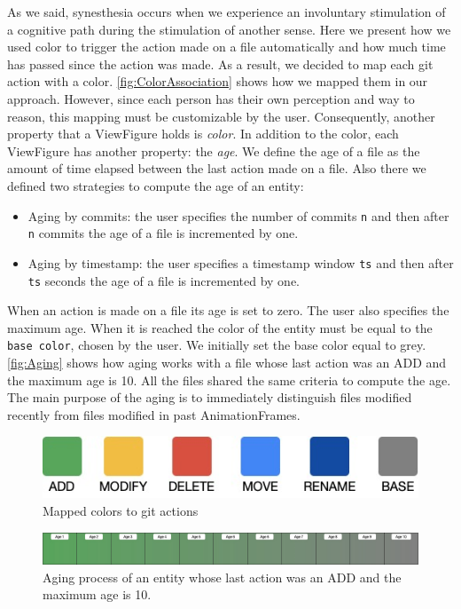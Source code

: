 As we said, synesthesia occurs when we experience an involuntary stimulation of a cognitive path during the stimulation of another sense. Here we present how we used color to trigger the action made on a file automatically and how much time has passed since the action was made. 
As a result, we decided to map each git action with a color. \autoref{fig:ColorAssociation} shows how we mapped them in our approach. However, since each person has their own perception and way to reason, this mapping must be customizable by the user. Consequently, another property that a ViewFigure holds is \textit{color}.
\bigbreak
In addition to the color, each ViewFigure has another property: the \textit{age}. We define the age of a file as the amount of time elapsed between the last action made on a file. Also there we defined two strategies to compute the age of an entity:

\begin{itemize}
    \item{Aging by commits}: the user specifies the number of commits \texttt{n} and then after \texttt{n} commits the age of a file is incremented by one. 
    \item{Aging by timestamp}:  the user specifies a timestamp window \texttt{ts} and then after \texttt{ts} seconds the age of a file is incremented by one.
\end{itemize}

When an action is made on a file its age is set to zero. 
\bigbreak
The user also specifies the maximum age. When it is reached the color of the entity must be equal to the \texttt{base color}, chosen by the user. 
We initially set the base color equal to grey. \autoref{fig:Aging} shows how aging works with a file whose last action was an ADD and the maximum age is 10. 
\bigbreak
All the files shared the same criteria to compute the age. The main purpose of the aging is to immediately distinguish files modified recently from files modified in past AnimationFrames.

\begin{figure}
    \center
    \includegraphics[width=0.\textwidth]{ColorMapping.jpg}
    \caption{Mapped colors to git actions}
    \label{fig:ColorAssociation}
\end{figure}


\begin{figure}
    \center
    \includegraphics[width=\textwidth]{Aging.jpg}
    \caption{Aging process of an entity whose last action was an ADD and the maximum age is 10. }
    \label{fig:Aging}
\end{figure}



